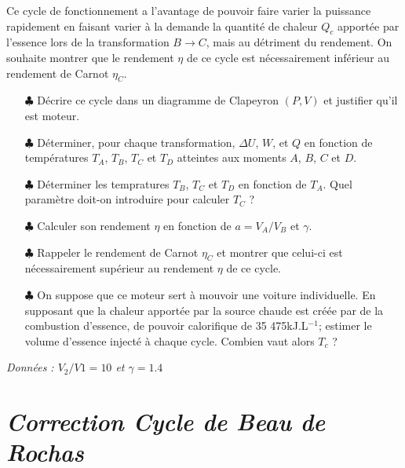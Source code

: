 \documentclass{report}
\begin{document}
Ce cycle de fonctionnement a l'avantage de pouvoir faire varier la puissance rapidement en faisant varier à la demande la quantité de chaleur $Q_c$ apportée par l'essence lors de la transformation $B \rightarrow C$, mais au détriment du rendement. On souhaite montrer que le rendement $\eta$ de ce cycle est nécessairement inférieur au rendement de Carnot $\eta_C$.

\begin{itemize}

	\item[$\clubsuit$] Décrire ce cycle dans un diagramme de Clapeyron $(P,V)$ et justifier qu'il est moteur.

	\item[$\clubsuit$] Déterminer, pour chaque transformation, $\Delta U$, $W$, et $Q$ en fonction de températures $T_A$, $T_B$, $T_C$ et $T_D$ atteintes aux moments $A$, $B$, $C$ et $D$.
	
	\item[$\clubsuit$] Déterminer les tempratures $T_B$, $T_C$ et $T_D$ en fonction de $T_A$. Quel paramètre doit-on introduire pour calculer $T_C$ ? 
	
	\item[$\clubsuit$]  Calculer son rendement $\eta$ en fonction de $a=V_A/V_B$ et $\gamma$. 
	
	\item[$\clubsuit$] Rappeler le rendement de Carnot $\eta_C$ et montrer que celui-ci est nécessairement supérieur au rendement $\eta$ de ce cycle.
	
	\item[$\clubsuit$] On suppose que ce moteur sert à mouvoir une voiture individuelle. En supposant que la chaleur apportée par la source chaude est créée par de la combustion d'essence, de pouvoir calorifique de 35 475kJ.L$^{-1}$; estimer le volume d'essence injecté à chaque cycle. Combien vaut alors $T_c$ ?
	
\end{itemize}

\textit{Données : $ V_{2}/V{1} = 10$ et $ \gamma=1.4$}

\newpage

\section*{\textit{Correction Cycle de Beau de Rochas}}
\end{document}
